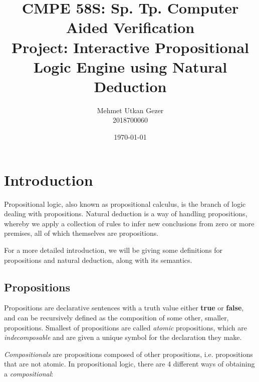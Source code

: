 \documentclass[12pt]{article}
\title{CMPE 58S: Sp. Tp. Computer Aided Verification \\ Project: Interactive Propositional Logic Engine using Natural Deduction}
\date{\today{}}
\author{Mehmet Utkan Gezer \\ 2018700060}
\newcommand{\true}{\textbf{true}}
\newcommand{\false}{\textbf{false}}
\begin{document}
\maketitle
\pagebreak

\section{Introduction}

Propositional logic, also known as propositional calculus, is the branch
of logic dealing with propositions. Natural deduction is a way of handling
propositions, whereby we apply a collection of rules to infer new
conclusions from zero or more premises, all of which themselves are
propositions.

For a more detailed introduction, we will be giving some definitions for
propositions and natural deduction, along with its semantics.

\subsection{Propositions}\label{sec:intr_prop}

Propositions are declarative
sentences with a truth value either \true{} or \false{},
and can be recursively defined as the composition of
some other, smaller, propositions. Smallest of propositions are
called \textit{atomic} propositions, which are \textit{indecomposable}
and are given a unique symbol for the declaration they make.

\textit{Compositionals} are propositions composed of other propositions,
i.e. propositions that are not atomic. In propositional logic, there
are 4 different ways of obtaining a \textit{compositional}:
\end{document}
